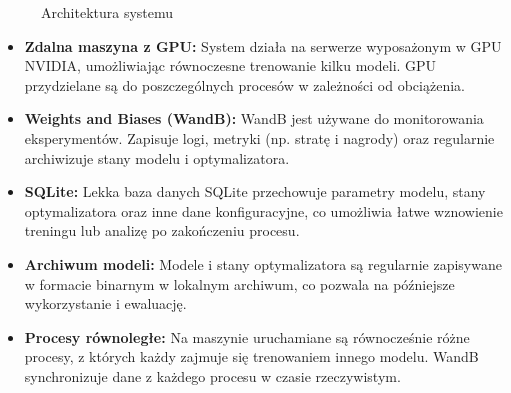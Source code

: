 \begin{figure}[!ht]
	\begin{center}
	\end{center}
	\caption{Architektura systemu}
	\label{fig:systemarchitecture}
\end{figure}

\begin{itemize}
	\item \textbf{Zdalna maszyna z GPU:} System działa na serwerze wyposażonym w GPU NVIDIA, umożliwiając równoczesne trenowanie kilku modeli. GPU przydzielane są do poszczególnych procesów w zależności od obciążenia.
	\item \textbf{Weights and Biases (WandB):} WandB jest używane do monitorowania eksperymentów. Zapisuje logi, metryki (np. stratę i nagrody) oraz regularnie archiwizuje stany modelu i optymalizatora.
	\item \textbf{SQLite:} Lekka baza danych SQLite przechowuje parametry modelu, stany optymalizatora oraz inne dane konfiguracyjne, co umożliwia łatwe wznowienie treningu lub analizę po zakończeniu procesu.
	\item \textbf{Archiwum modeli:} Modele i stany optymalizatora są regularnie zapisywane w formacie binarnym w lokalnym archiwum, co pozwala na późniejsze wykorzystanie i ewaluację.
	\item \textbf{Procesy równoległe:} Na maszynie uruchamiane są równocześnie różne procesy, z których każdy zajmuje się trenowaniem innego modelu. WandB synchronizuje dane z każdego procesu w czasie rzeczywistym.
\end{itemize}

